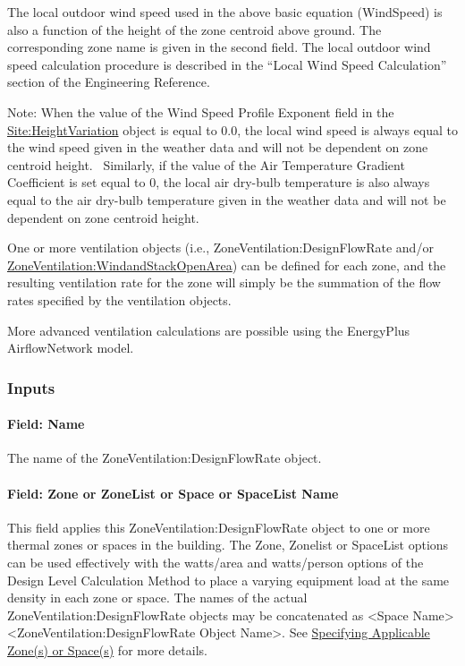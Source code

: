 The local outdoor wind speed used in the above basic equation (WindSpeed) is also a function of the height of the zone centroid above ground. The corresponding zone name is given in the second field. The local outdoor wind speed calculation procedure is described in the ``Local Wind Speed Calculation'' section of the Engineering Reference.

Note: When the value of the Wind Speed Profile Exponent field in the \hyperref[siteheightvariation]{Site:HeightVariation} object is equal to 0.0, the local wind speed is always equal to the wind speed given in the weather data and will not be dependent on zone centroid height.~ Similarly, if the value of the Air Temperature Gradient Coefficient is set equal to 0, the local air dry-bulb temperature is also always equal to the air dry-bulb temperature given in the weather data and will not be dependent on zone centroid height.

One or more ventilation objects (i.e., ZoneVentilation:DesignFlowRate and/or \hyperref[zoneventilationwindandstackopenarea]{ZoneVentilation:WindandStackOpenArea}) can be defined for each zone, and the resulting ventilation rate for the zone will simply be the summation of the flow rates specified by the ventilation objects.

More advanced ventilation calculations are possible using the EnergyPlus AirflowNetwork model.

\subsubsection{Inputs}\label{inputs-2016-06-17-0936}

\paragraph{Field: Name}\label{field-name-2016-06-16}

The name of the ZoneVentilation:DesignFlowRate object.

\paragraph{Field: Zone or ZoneList or Space or SpaceList Name}\label{field-zone-or-zonelist-name-1}

This field applies this ZoneVentilation:DesignFlowRate object to one or more thermal zones or spaces in the building. The Zone, Zonelist or SpaceList options can be used effectively with the watts/area and watts/person options of the Design Level Calculation Method to place a varying equipment load at the same density in each zone or space. The names of the actual ZoneVentilation:DesignFlowRate objects may be concatenated as \textless{}Space Name\textgreater{} \textless{}ZoneVentilation:DesignFlowRate Object Name\textgreater{}. See \hyperref[specifying-applicable-zones-or-spaces]{Specifying Applicable Zone(s) or Space(s)} for more details.

